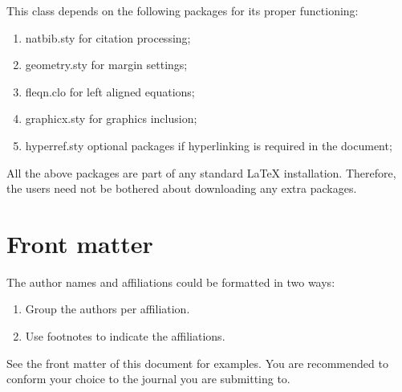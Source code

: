 \documentclass[a4paper,fleqn]{cas-dc}
\begin{document}
This class depends on the following packages
for its proper functioning:

\begin{enumerate}
\itemsep=0pt
\item {natbib.sty} for citation processing;
\item {geometry.sty} for margin settings;
\item {fleqn.clo} for left aligned equations;
\item {graphicx.sty} for graphics inclusion;
\item {hyperref.sty} optional packages if hyperlinking is
  required in the document;
\end{enumerate}  

All the above packages are part of any
standard \LaTeX{} installation.
Therefore, the users need not be
bothered about downloading any extra packages.

\section{Front matter}

The author names and affiliations could be formatted in two ways:
\begin{enumerate}[(1)]
\item Group the authors per affiliation.
\item Use footnotes to indicate the affiliations.
\end{enumerate}
See the front matter of this document for examples. 
You are recommended to conform your choice to the journal you 
are submitting to.
\end{document}
